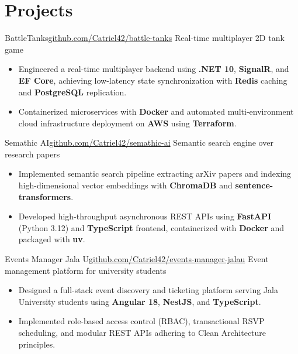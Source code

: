 \section*{Projects}
\resumeSubHeadingListStart

\resumeSubheading
{BattleTanks}{\href{https://github.com/Catriel42/battle-tanks}{github.com/Catriel42/battle-tanks}}
{Real-time multiplayer 2D tank game}
{}

\begin{itemize}
    \item Engineered a real-time multiplayer backend using \textbf{.NET 10}, \textbf{SignalR}, and \textbf{EF Core}, achieving low-latency state synchronization with \textbf{Redis} caching and \textbf{PostgreSQL} replication.
    \item Containerized microservices with \textbf{Docker} and automated multi-environment cloud infrastructure deployment on \textbf{AWS} using \textbf{Terraform}.
\end{itemize}

\resumeSubheading
{Semathic AI}{\href{https://github.com/Catriel42/semathic-ai}{github.com/Catriel42/semathic-ai}}
{Semantic search engine over research papers}
{}

\begin{itemize}
    \item Implemented semantic search pipeline extracting arXiv papers and indexing high-dimensional vector embeddings with \textbf{ChromaDB} and \textbf{sentence-transformers}.
    \item Developed high-throughput asynchronous REST APIs using \textbf{FastAPI} (Python 3.12) and \textbf{TypeScript} frontend, containerized with \textbf{Docker} and packaged with \textbf{uv}.
\end{itemize}

\resumeSubheading
{Events Manager Jala U}{\href{https://github.com/Catriel42/events-manager-jalau}{github.com/Catriel42/events-manager-jalau}}
{Event management platform for university students}
{}

\begin{itemize}
    \item Designed a full-stack event discovery and ticketing platform serving Jala University students using \textbf{Angular 18}, \textbf{NestJS}, and \textbf{TypeScript}.
    \item Implemented role-based access control (RBAC), transactional RSVP scheduling, and modular REST APIs adhering to Clean Architecture principles.
\end{itemize}

